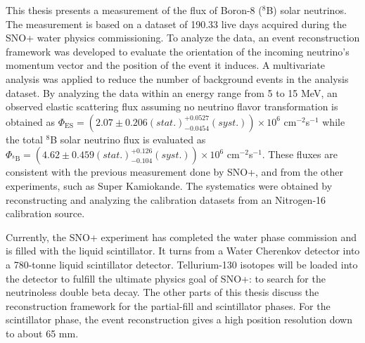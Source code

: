 This thesis presents a measurement of the flux of Boron-8 ($^8$B) solar neutrinos. The measurement is based on a dataset of 190.33 live days acquired during the SNO+ water physics commissioning. To analyze the data, an event reconstruction framework was developed to evaluate the orientation of the incoming neutrino's momentum vector and the position of the event it induces. A multivariate analysis was applied to reduce the number of background events in the analysis dataset. By analyzing the data within an energy range from 5 to 15 MeV, an observed elastic scattering flux assuming no neutrino flavor transformation is obtained as $\Phi_{\mathrm{ES}}=(2.07 \pm 0.206 (stat.)^{+0.0527}_{-0.0454}(syst.))\times10^6$ cm$^{-2}$s$^{-1}$ while the total $^8$B solar neutrino flux is evaluated as $\Phi_{\mathrm{^8B}}=(4.62 \pm 0.459 (stat.)^{+0.126}_{-0.104}(syst.))\times10^6$ cm$^{-2}$s$^{-1}$. These fluxes are consistent with the previous measurement done by SNO+\cite{anderson2019measurement}, and from the other experiments, such as Super Kamiokande\cite{abe2016solar}. The systematics were obtained by reconstructing and analyzing the calibration datasets from an Nitrogen-16 calibration source.

Currently, the SNO+ experiment has completed the water phase commission and is filled with the liquid scintillator. It turns from a Water Cherenkov detector into a 780-tonne liquid scintillator detector. Tellurium-130 isotopes will be loaded into the detector to fulfill the ultimate physics goal of SNO+: to search for the neutrinoless double beta decay. The other parts of this thesis discuss the reconstruction framework for the partial-fill and scintillator phases. For the scintillator phase, the event reconstruction gives a high position resolution down to about 65 mm. %